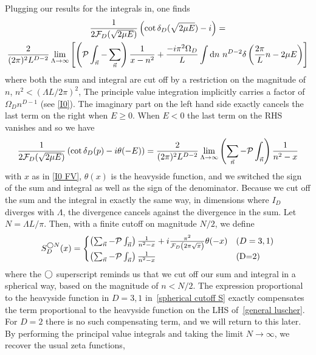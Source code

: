 Plugging our results for the integrals in, one finds
\begin{multline}
    \frac{1}{2\mathcal{F}_{D}(\sqrt{2\mu E})}\left(\cot \delta_{D}(\sqrt{2\mu E}) - i\right)
    =\\
    \frac{2}{(2\pi)^2 L^{D-2}}
    \lim\limits_{\Lambda \to \infty}
    \left[
    	\left(\mathcal{P}\int_{\vec{n}} - \sum_{\vec{n}}\right) \frac{1}{x-n^2} +
		\frac{-i \pi^2\Omega_D}{L} \int \mathrm{d}n\ n^{D-2} \delta\left(\frac{2\pi}{L}n - 2\mu E\right)
	\right]
\end{multline}
where both the sum and integral are cut off by a restriction on the magnitude of $n$, $n^2 < (\Lambda L / 2\pi)^2$,
The principle value integration implicitly carries a factor of $\Omega_D n^{D-1}$ (see \eqref{I0}).
The imaginary part on the left hand side exactly cancels the last term on the right when $E\ge0$.  When $E<0$ the last term on the RHS vanishes and so we have 
\begin{equation}\label{eq:general luscher}
   \frac{1}{2\mathcal{F}_{D}(\sqrt{2\mu E})}  \left( \cot \delta_{D}(p)-i\theta(-E)\right)
    =
   \frac{2}{(2\pi)^2 L^{D-2}}
    \lim\limits_{\Lambda \to \infty}\left(\sum_{\vec{n}}-\mathcal{P}\int_{\vec{n}}\right) \frac{1}{n^2-x}
\end{equation}
with $x$ as in \eqref{I0 FV}, $\theta(x)$ is the heavyside function, and we switched the sign of the sum and integral as well as the sign of the denominator.
Because we cut off the sum and the integral in exactly the same way, in dimensions where $I_D$ diverges with $\Lambda$, the divergence cancels against the divergence in the sum.
Let $N=\Lambda L/\pi$.
Then, with a finite cutoff on magnitude $N/2$, we define
\begin{equation}\label{eq:spherical cutoff S}
    S^{\bigcirc N}_D(x) = \begin{cases}
    \left(\sum_{\vec{n}}- \mathcal{P}\int_{\vec{n}}\right) \frac{1}{n^2-x}+i\frac{\pi^2}{\mathcal{F}_D\left(2\pi\sqrt{x}\right)}\theta(-x) & \text{($D=3,1$)}\\
    \left(\sum_{\vec{n}}- \mathcal{P}\int_{\vec{n}}\right) \frac{1}{n^2-x} & \text{(D=2)}
    \end{cases}
\end{equation}
where the $\bigcirc$ superscript reminds us that we cut off our sum and integral in a spherical way, based on the magnitude of $n<N/2$.  The expression proportional to the heavyside function in $D=3,1$ in~\eqref{spherical cutoff S} exactly compensates the term proportional to the heavyside function on the LHS of~\eqref{general luscher}.  For $D=2$ there is no such compensating term, and we will return to this later.  By performing the principal value integrals and taking the limit $N\to \infty$, we recover the usual \Luscher zeta functions,
